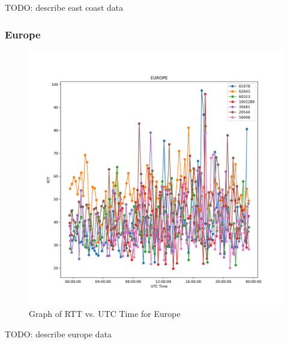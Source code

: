 \documentclass[acmsmall]{acmart}
\begin{document}
TODO: describe east coast data

\subsubsection{Europe}
\begin{figure}
    \centering
    \includegraphics[scale=0.5]{graphs/eur.png}
    \caption{Graph of RTT vs. UTC Time for Europe}
    \label{fig:eruope}
\end{figure}
    
TODO: describe europe data
\end{document}
